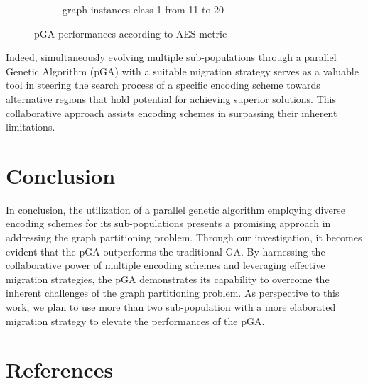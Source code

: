 \documentclass[review]{elsarticle}
\begin{document}
\begin{center}
\begin{figure}[H]
\begin{subfigure}{0.45\textwidth}
			\caption{\label{AES_METRIC_C2} graph instances class 1 from 11 to 20}
		\end{subfigure}
		\caption{\label{AES_METRIC}pGA performances according to AES metric}
		
	\end{figure}
\end{center}
Indeed, simultaneously evolving multiple sub-populations through a parallel Genetic Algorithm (pGA) with a suitable migration strategy serves as a valuable tool in steering the search process of a specific encoding scheme towards alternative regions that hold potential for achieving superior solutions. This collaborative approach assists encoding schemes in surpassing their inherent limitations.

\section{Conclusion}
In conclusion, the utilization of a parallel genetic algorithm employing diverse encoding schemes for its sub-populations presents a promising approach in addressing the graph partitioning problem. Through our investigation, it becomes evident that the pGA outperforms the traditional GA. By harnessing the collaborative power of multiple encoding schemes and leveraging effective migration strategies, the pGA demonstrates its capability to overcome the inherent challenges of the graph partitioning problem. As perspective to this work, we plan to use more than two sub-population with a more elaborated migration strategy to elevate the performances of the pGA.






\section*{References}

\end{document}
